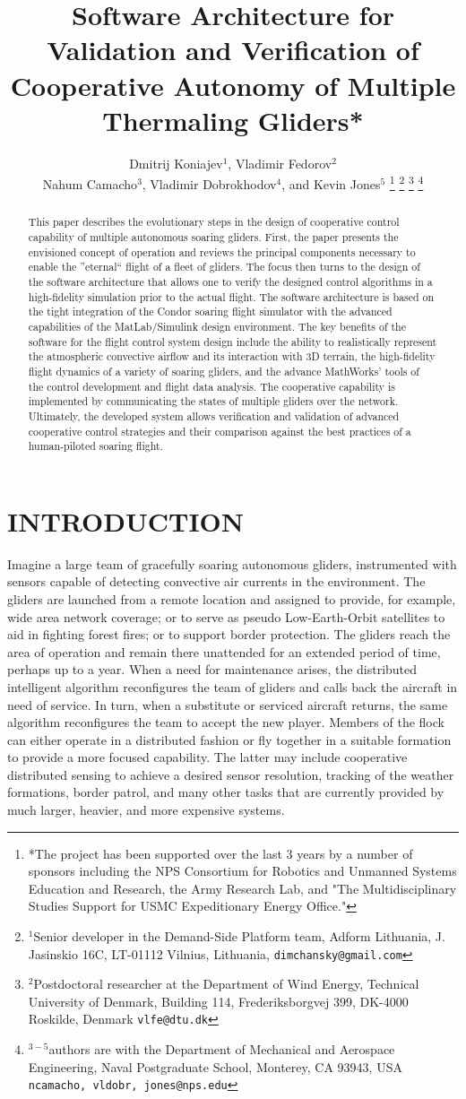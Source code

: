 \documentclass[letterpaper, 10 pt, conference]{ieeeconf}  %
\title{\LARGE \bf
Software Architecture for Validation and Verification of Cooperative Autonomy of Multiple Thermaling Gliders* }
\author{Dmitrij Koniajev$^{1}$, Vladimir Fedorov$^{2}$ \\
    Nahum Camacho$^{3}$, Vladimir Dobrokhodov$^{4}$, and Kevin Jones$^{5}$%
\thanks{*The project has been supported over the last 3 years by a number of
sponsors including the NPS Consortium for Robotics and Unmanned Systems Education and Research, the Army Research Lab, and "The Multidisciplinary Studies Support for USMC Expeditionary Energy Office."}%
\thanks{$^{1}$Senior developer in the Demand-Side Platform team,
        Adform Lithuania, J. Jasinskio 16C, LT-01112 Vilnius, Lithuania,
        {\tt\small {dimchansky@gmail.com}}}%
\thanks{$^{2}$Postdoctoral researcher at the Department of Wind Energy,
        Technical University of Denmark, Building 114, Frederiksborgvej 399, DK-4000 Roskilde,
        Denmark
        {\tt\small {vlfe@dtu.dk}}}%
\thanks{$^{3-5}$authors are with the Department of Mechanical and Aerospace Engineering,
        Naval Postgraduate School, Monterey, CA 93943, USA
        {\tt\small {ncamacho, vldobr, jones}@nps.edu}}%
} %
\newcommand{\squeezeup}{\vspace{-1.0mm}}
\begin{document}
\maketitle \thispagestyle{empty} \pagestyle{empty}


\begin{abstract}
This paper describes the evolutionary steps in the design of cooperative control capability of multiple autonomous soaring gliders. First, the paper presents the envisioned concept of operation and reviews the principal components necessary to enable the ''eternal`` flight of a fleet of gliders. The focus then turns to the design of the software architecture that allows one to verify the designed control algorithms in a high-fidelity simulation prior to the actual flight. The software architecture is based on the tight integration of the Condor soaring flight simulator with the advanced capabilities of the MatLab/Simulink design environment. The key benefits of the software for the flight control system design include the ability to realistically represent the atmospheric convective airflow and its interaction with 3D terrain, the high-fidelity flight dynamics of a variety of soaring gliders, and the advance MathWorks' tools of the control development and flight data analysis. The cooperative capability is implemented by communicating the states of multiple gliders over the network. Ultimately, the developed system allows verification and validation of advanced cooperative control strategies and their comparison against the best practices of a human-piloted soaring flight.
\end{abstract}


\section{INTRODUCTION}
\squeezeup
Imagine a large team of gracefully soaring autonomous gliders, instrumented with sensors capable of detecting convective air currents in the environment. The gliders are launched from a remote location and assigned to provide, for example, wide area network coverage; or to serve as pseudo Low-Earth-Orbit satellites to aid in fighting forest fires; or to support border protection. The gliders reach the area of operation and remain there unattended for an extended period of time, perhaps up to a year. When a need for maintenance arises, the distributed intelligent algorithm reconfigures the team of gliders and calls back the aircraft in need of service. In turn, when a substitute or serviced aircraft returns, the same algorithm reconfigures the team to accept the new player. Members of the flock can either operate in a distributed fashion or fly together in a suitable formation to provide a more focused capability. The latter may include cooperative distributed sensing to achieve a desired sensor resolution, tracking of the weather formations, border patrol, and many other tasks that are currently provided by much larger, heavier, and more expensive systems.
\end{document}
